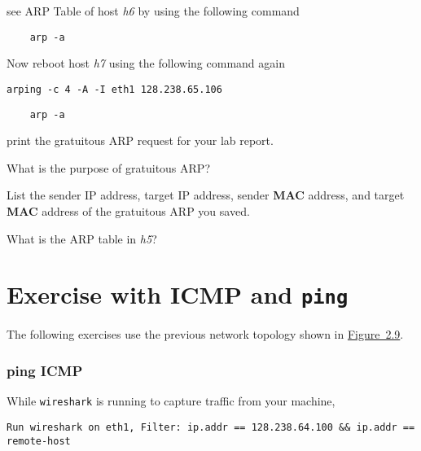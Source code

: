 \documentclass{UTNetLab}
\begin{document}
    see ARP Table of host \textit{h6} by using the following command
    
    \begin{lstlisting}
    arp -a
    \end{lstlisting}
    
    Now reboot host \textit{h7} using the following command again
    
    \begin{lstlisting}[emph={eth1,h7-ip,h6-ip}]
    arping -c 4 -A -I eth1 128.238.65.106
    \end{lstlisting}
    
    \begin{lstlisting}
    arp -a
    \end{lstlisting}
    
    print the gratuitous ARP request for your lab report.
    
    \begin{report}
        \item What is the purpose of gratuitous ARP?
    
        \item List the sender IP address, target IP address, sender \textbf{MAC} address, and target \textbf{MAC} address of the gratuitous ARP you saved.

        \item What is the ARP table in \textit{h5}?
    \end{report}


\part{Exercise with ICMP and \texttt{ping}}\label{sec:icmp-ping}
    The following exercises use the previous network topology shown in \hyperref[fig:2.9]{Figure~2.9}.

\section{ping ICMP}
    While \lstinline{wireshark} is running to capture traffic from your machine,
    
    \begin{lstlisting}[emph={remote-host}]
    Run wireshark on eth1, Filter: ip.addr == 128.238.64.100 && ip.addr == remote-host
    \end{lstlisting}
    
\end{document}
